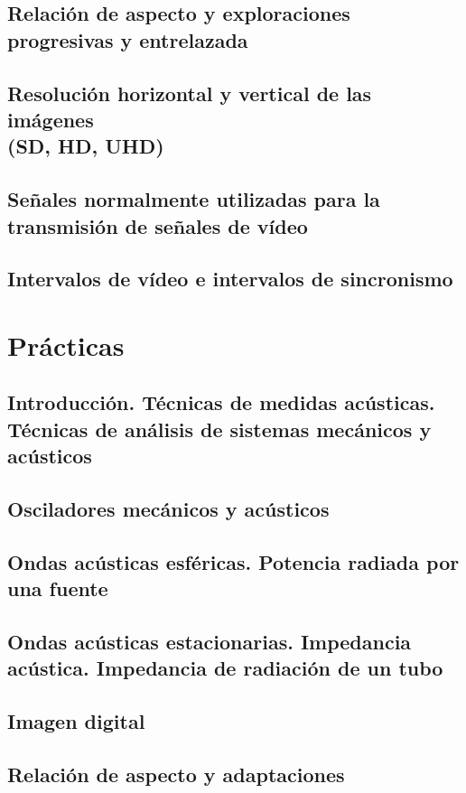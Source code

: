 \documentclass[a4paper]{book}
\begin{document}
\section{Relación de aspecto y exploraciones progresivas y entrelazada}
\section[Resolución horizontal y vertical de las imágenes (SD, HD, UHD)]{Resolución horizontal y vertical de las imágenes\\ (SD, HD, UHD)}
\section{Señales normalmente utilizadas para la transmisión de señales de vídeo}
\section{Intervalos de vídeo e intervalos de sincronismo}

\appendix

\chapter{Prácticas}
\section[Introducción. Técnicas de medidas acústicas. Técnicas de análisis de sistemas mecánicos y acústicos]{Introducción. Técnicas de medidas acústicas.\\ Técnicas de análisis de sistemas mecánicos y acústicos}
\section{Osciladores mecánicos y acústicos}
\section{Ondas acústicas esféricas. Potencia radiada por una fuente}
\section{Ondas acústicas estacionarias. Impedancia acústica. Impedancia de radiación de un tubo}
\section{Imagen digital}
\section{Relación de aspecto y adaptaciones}
\end{document}
